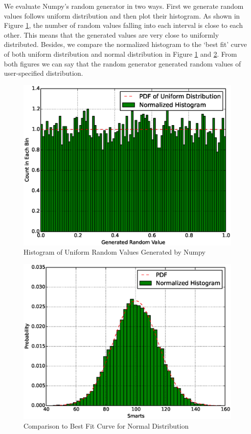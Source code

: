 \documentclass[12pt]{article}  %
\theoremstyle{definition}
\theoremstyle{remark}
\begin{document}
We evaluate Numpy's random generator in two ways. First we generate random values follows uniform distribution and then plot their histogram.
As shown in Figure \ref{fig:uniform}, the number of random values falling into each interval is close to each other.
This means that the generated values are very close to uniformly distributed.
Besides, we compare the normalized histogram to the `best fit' curve of both uniform distribution and normal distribution in Figure \ref{fig:uniform} and \ref{fig:normal}.
From both figures we can say that the random generator generated random values of user-specified distribution.


\begin{figure}
\centering
        \includegraphics[scale=0.6]{rg_histogram.eps}
        \caption{Histogram of Uniform Random Values Generated by Numpy}
        \label{fig:uniform}
\end{figure}
\begin{figure}
        \centering
        \includegraphics[scale=0.6]{rg_fitness.eps}
        \caption{Comparison to Best Fit Curve for Normal Distribution}
        \label{fig:normal}
\end{figure}
\end{document}
